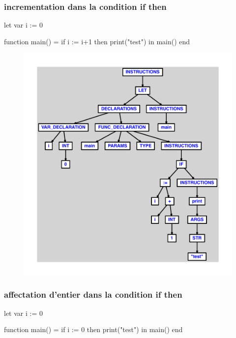 \documentclass{article}
\begin{document}
\subsubsection{incrementation dans la condition if then}
\begin{verbatimtab}
let
	var i := 0

	function main() =
		if i := i+1 then
			print("test")
in main() end
\end{verbatimtab}
\begin{figure}[H]\centering\includegraphics[max width=\textwidth]{ast/ast_239.pdf}\end{figure}\subsubsection{affectation d'entier dans la condition if then}
\begin{verbatimtab}
let
	var i := 0

	function main() =
		if i := 0 then
			print("test")
in main() end
\end{verbatimtab}
\end{document}
